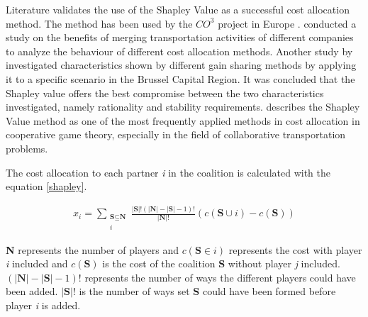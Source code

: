 Literature validates the use of the Shapley Value as a successful cost allocation method. The method has been used by the \(CO^3\) project in Europe \citep{defryn2013gain}. \citet{ozener2008allocating} conducted a study on the benefits of merging transportation activities of different companies to analyze the behaviour of different cost allocation methods. Another study by \citet{janjevic2018investigating} investigated characteristics shown by different gain sharing methods by applying it to a specific scenario in the Brussel Capital Region. It was concluded that the Shapley value offers the best compromise between the two characteristics investigated, namely rationality and stability requirements.
\citep{guajardo2016review} describes the Shapley Value method as one of the most frequently applied methods in cost allocation in cooperative game theory, especially in the field of collaborative transportation problems.\par

The cost allocation to each partner \textit{i} in the coalition is calculated with the equation \ref{shapley}.
 
\begin{equation}
\label{shapley}
\begin{split}
x_i= \sum_{\substack{\textbf{S}\subseteq \textbf{N}\\i}} \frac{|\textbf{S}|!(|\textbf{N}| - |\textbf{S}| - 1)!}{|\textbf{N}|!}(c(\textbf{S}\cup i) - c(\textbf{S}))
\end{split}
\end{equation}

\textbf{N} represents the number of players and \(c(\textbf{S} \in i)\) represents the cost with player \textit{i} included and \( c(\textbf{S})\) is the cost of the coalition \textbf{S} without player \textit{j} included. \((|\textbf{N}| - |\textbf{S}| - 1)!\) represents the number of ways the different players could have been added. \(|\textbf{S}|!\) is the number of ways set \textbf{S} could have been formed before player \textit{i} is added.


